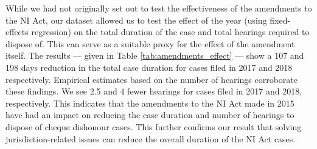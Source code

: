 \documentclass[12pt,a4paper]{article}
\begin{document}
While we had not originally set out to test the effectiveness of the amendments to the NI Act, our dataset allowed us to test the effect of the year (using fixed-effects regression) on the total duration of the case and total hearings required to dispose of. This can serve as a suitable proxy for the effect of the amendment itself. The results --- given in Table \ref{tab:amendments_effect} --- show a 107 and 198 days reduction in the total case duration for cases filed in 2017 and 2018 respectively. Empirical estimates based on the number of hearings corroborate these findings. We see 2.5 and 4 fewer hearings for cases filed in 2017 and 2018, respectively. This indicates that the amendments to the NI Act made in 2015 have had an impact on reducing the case duration and number of hearings to dispose of cheque dishonour cases. This further confirms our result that solving jurisdiction-related issues can reduce the overall duration of the NI Act cases.
\end{document}
